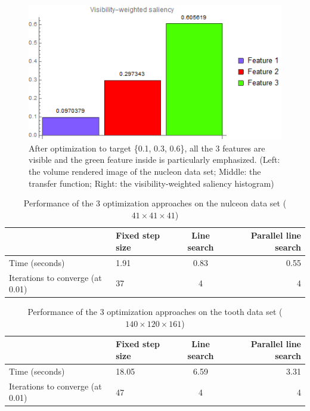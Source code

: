 \begin{figure}
\begin{minipage}{.2\textwidth}
	\end{minipage}~
	\begin{minipage}{.4\textwidth}
		\includegraphics[width=1\linewidth]{images/nucleon_strong_red_optimized_fixed_visibility_saliency_weighted_chart}
	\end{minipage}
	\caption{After optimization to target \{0.1, 0.3, 0.6\}, all the 3 features are visible and the green feature inside is particularly emphasized. (Left: the volume rendered image of the nucleon data set; Middle: the transfer function; Right: the visibility-weighted saliency histogram)}
	\label{fig:nucleon_strong_red_optimized_fixed}
\end{figure}

\begin{table}[h]
\begin{tabular}{ l | l c r }
	& Fixed step size & Line search & Parallel line search \\
	\hline
	Time (seconds) & 1.91 & 0.83 & 0.55 \\
	Iterations to converge (at 0.01) & 37 & 4 & 4 \\
\end{tabular}
\caption[Table caption text]{Performance of the 3 optimization approaches on the nulceon data set ($ 41 \times 41 \times 41 $)}
\label{table:nucleon_table}
\end{table}

\begin{table}[h]
	\begin{tabular}{ l | l c r }
		& Fixed step size & Line search & Parallel line search \\
		\hline
		Time (seconds) & 18.05 & 6.59 & 3.31 \\
		Iterations to converge (at 0.01) & 47 & 4 & 4 \\
	\end{tabular}
	\caption[Table caption text]{Performance of the 3 optimization approaches on the tooth data set ($ 140 \times 120 \times 161 $)}
	\label{table:tooth_table}
\end{table}

